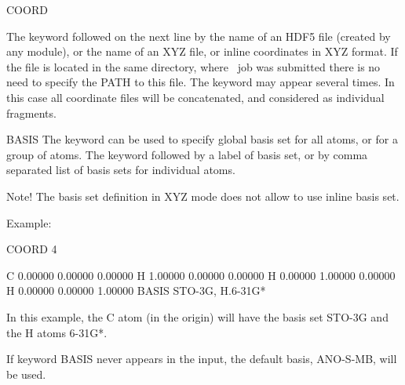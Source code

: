 \begin{keywordlist}

\item[COORD]

The keyword followed on the next line by the name of an HDF5 file (created by any module), or the name of an XYZ file,
or inline coordinates in XYZ format. If the file is located in the same directory, where
\molcas\ job was submitted there is no need to specify the PATH to this file.
The keyword may appear several times. In this case all coordinate files
will be concatenated, and considered as individual fragments.

\item[BASIS]
The keyword can be used to specify global basis set for all atoms, or for a group of atoms.
The keyword followed by a label of basis set, or by comma separated list of basis sets for
individual atoms.

Note! The basis set definition in XYZ mode does not allow to use
inline basis set.

Example:
\begin{sourcelisting}
COORD
4

C           0.00000 0.00000 0.00000
H           1.00000 0.00000 0.00000
H           0.00000 1.00000 0.00000
H           0.00000 0.00000 1.00000
BASIS
STO-3G, H.6-31G*
\end{sourcelisting}

In this example, the C atom (in the origin) will have the basis set STO-3G and
the H atoms 6-31G*.

If keyword BASIS never appears in the input, the default basis,
ANO-S-MB, will be used.




\end{keywordlist}
